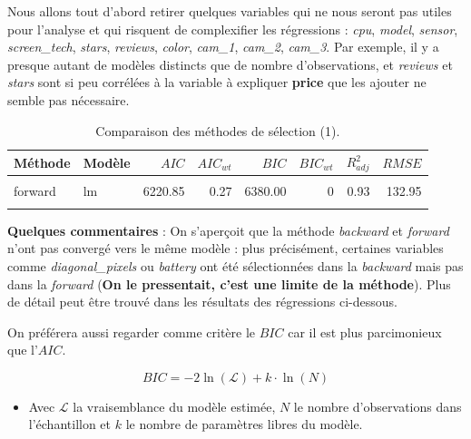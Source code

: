 \documentclass[
  12pt,
]{report}
\providecommand{\tightlist}{%
  \setlength{\itemsep}{0pt}\setlength{\parskip}{0pt}}\usepackage{longtable,booktabs,array}
\begin{document}
Nous allons tout d'abord retirer quelques variables qui ne nous seront
pas utiles pour l'analyse et qui risquent de complexifier les
régressions : \emph{cpu}, \emph{model}, \emph{sensor},
\emph{screen\_tech}, \emph{stars}, \emph{reviews}, \emph{color},
\emph{cam\_1}, \emph{cam\_2}, \emph{cam\_3}. Par exemple, il y a presque
autant de modèles distincts que de nombre d'observations, et
\emph{reviews} et \emph{stars} sont si peu corrélées à la variable à
expliquer \textbf{price} que les ajouter ne semble pas nécessaire.

\begin{table}[!h]
\centering
\caption{\label{tab:kable_perf}Comparaison des méthodes de sélection (1).}
\centering
\begin{tabular}[t]{llrrrrrr}
\toprule
\textbf{Méthode} & \textbf{Modèle} & \textbf{$AIC$} & \textbf{$AIC_{wt}$} & \textbf{$BIC$} & \textbf{$BIC_{wt}$} & \textbf{$R^2_{adj}$} & \textbf{$RMSE$}\\
\midrule
\cellcolor{gray!10}{backward} & \cellcolor{gray!10}{lm} & \cellcolor{gray!10}{6218.90} & \cellcolor{gray!10}{0.72} & \cellcolor{gray!10}{6386.43} & \cellcolor{gray!10}{0} & \cellcolor{gray!10}{0.93} & \cellcolor{gray!10}{132.14}\\
forward & lm & 6220.85 & 0.27 & 6380.00 & 0 & 0.93 & 132.95\\
\cellcolor{gray!10}{genetic} & \cellcolor{gray!10}{lm} & \cellcolor{gray!10}{6229.89} & \cellcolor{gray!10}{0.00} & \cellcolor{gray!10}{6363.91} & \cellcolor{gray!10}{1} & \cellcolor{gray!10}{0.92} & \cellcolor{gray!10}{135.85}\\
\bottomrule
\end{tabular}
\end{table}

\textbf{Quelques commentaires} : On s'aperçoit que la méthode
\emph{backward} et \emph{forward} n'ont pas convergé vers le même modèle
: plus précisément, certaines variables comme \emph{diagonal\_pixels} ou
\emph{battery} ont été sélectionnées dans la \emph{backward} mais pas
dans la \emph{forward} (\textbf{On le pressentait, c'est une limite de
la méthode}). Plus de détail peut être trouvé dans les résultats des
régressions ci-dessous.

On préférera aussi regarder comme critère le \(BIC\) car il est plus
parcimonieux que l'\(AIC\).

\[ BIC = -2\ln(\mathcal{L}) + k \cdot \ln(N) \]

\begin{itemize}
\tightlist
\item
  Avec \(\mathcal{L}\) la vraisemblance du modèle estimée, \(N\) le
  nombre d'observations dans l'échantillon et \(k\) le nombre de
  paramètres libres du modèle.
\end{itemize}
\end{document}
